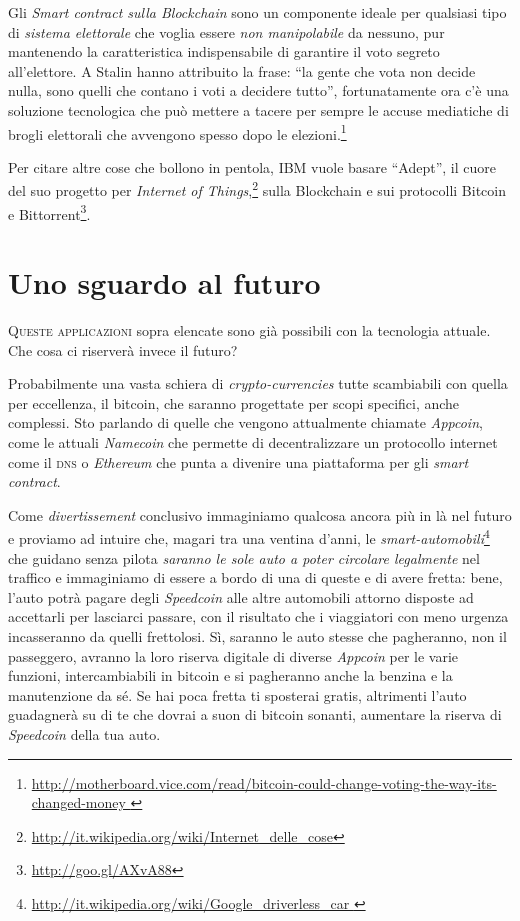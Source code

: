 \documentclass[a4paper,12pt,italian]{article}
\newcommand{\longurl}[1]{%
\href{#1}{\ttfamily \smaller #1}%
}%
\begin{document}
\bigskip

Gli \emph{Smart contract sulla Blockchain} sono un componente
ideale per qualsiasi tipo di \emph{sistema
elettorale} che voglia essere \emph{non manipolabile} da nessuno, pur
mantenendo la caratteristica indispensabile di garantire il voto
segreto all’elettore. A Stalin hanno attribuito la frase: “la gente che
vota non decide nulla, sono quelli che contano i voti a decidere
tutto”, fortunatamente ora c’è una soluzione tecnologica che può
mettere a tacere per sempre le accuse mediatiche di brogli elettorali
che avvengono spesso dopo le
elezioni.\footnote{\longurl{http://motherboard.vice.com/read/bitcoin-could-change-voting-the-way-its-changed-money
}}


\bigskip

Per citare altre cose che bollono in pentola, IBM vuole basare “Adept”,
il cuore del suo progetto per \emph{Internet of Things},\footnote{\url{http://it.wikipedia.org/wiki/Internet_delle_cose}}
sulla Blockchain e
sui protocolli Bitcoin e Bittorrent\footnote{\url{http://goo.gl/AXvA88}}.


\section*{Uno sguardo al futuro}

\lettrine[lines=2]{Q}{ueste applicazioni} sopra elencate sono già possibili con la tecnologia attuale. Che cosa ci
riserverà invece il futuro?

\bigskip

Probabilmente una vasta schiera di \emph{crypto-currencies} tutte scambiabili con
quella per eccellenza, il bitcoin, che saranno progettate per scopi
specifici, anche complessi. Sto parlando di quelle che vengono
attualmente chiamate \emph{Appcoin}, come le attuali \emph{Namecoin} che permette di
decentralizzare un protocollo internet come il \textsc{dns} o \emph{Ethereum} che punta
a divenire una piattaforma per gli \emph{smart contract}.

\bigskip

Come \emph{divertissement} conclusivo immaginiamo qualcosa ancora più in là nel
futuro e proviamo ad intuire che, magari tra una ventina d’anni, le
\emph{smart-automobili}\footnote{\url{http://it.wikipedia.org/wiki/Google\_driverless\_car
}} che guidano senza pilota \emph{saranno le sole auto a poter circolare
legalmente} nel traffico e immaginiamo di essere a bordo di una di
queste e di avere fretta: bene, l’auto potrà pagare degli \emph{Speedcoin}
alle altre automobili attorno disposte ad accettarli per lasciarci
passare, con il risultato che i viaggiatori con meno urgenza
incasseranno da quelli frettolosi. Sì, saranno le auto stesse che
pagheranno, non il passeggero, avranno la loro riserva digitale di
diverse \emph{Appcoin} per le varie funzioni, intercambiabili in bitcoin e si
pagheranno anche la benzina e la manutenzione da sé. Se hai poca fretta
ti sposterai gratis, altrimenti l’auto guadagnerà su di te che dovrai a
suon di bitcoin sonanti, aumentare la riserva di \emph{Speedcoin} della tua
auto.
\end{document}
